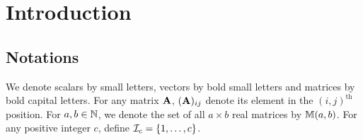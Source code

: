 \section{Introduction}
\subsection{Notations}
We denote scalars by small letters, vectors by bold small letters and matrices by bold capital letters. For any matrix ${\mathbf{A}}$, $({\mathbf{A}})_{ij}$ denote its element in the $(i,j)^\text{th}$ position. For $a,b \in {\mathbb{N}}$, we denote the set of all $a \times b$ real matrices by ${\mathbb{M}}(a,b)$. For any positive integer $c$, define ${\cal{I}}_c = \{ 1, \ldots, c\}$.